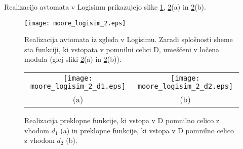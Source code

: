 \begin{resitev}
\begin{enumerate}
\bigskip



Realizacijo avtomata v Logisimu prikazujejo slike \ref{fig:logisim2}, \ref{fig:logisim2_d}(a) in \ref{fig:logisim2_d}(b).

\begin{figure}[ht]
\begin{center}
\texttt{[image: moore\_logisim\_2.eps]}
\end{center}
\caption{Realizacija avtomata iz zgleda v Logisimu. Zaradi splošnosti sheme sta funkciji, ki vstopata v pomnilni celici D, umeščeni v ločena modula (glej sliki \ref{fig:logisim2_d}(a) in \ref{fig:logisim2_d}(b)).}
\label{fig:logisim2}
\end{figure}


\begin{figure}[!ht]
\begin{center}
\begin{tabular}{cc}
\texttt{[image: moore\_logisim\_2\_d1.eps]} &
\texttt{[image: moore\_logisim\_2\_d2.eps]} \\
(a) & (b) \\
\end{tabular}
\caption{Realizacija preklopne funkcije, ki vstopa v D pomnilno celico z vhodom $d_1$ (a) in preklopne funkcije, ki vstopa v D pomnilno celico z vhodom $d_2$ (b).}
\label{fig:logisim2_d}
\end{center}
\end{figure}



\end{enumerate}
\end{resitev}